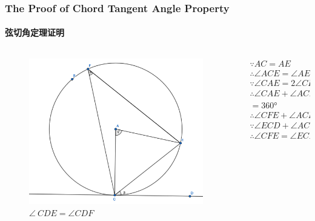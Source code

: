 \documentclass[
	11pt, %
]{beamer}
\begin{document}
\begin{frame}
\frametitle{The Proof of Chord Tangent Angle Property}
\framesubtitle{弦切角定理证明}

\begin{columns}[t] 
		\begin{column}{0.4\textwidth} %
			\begin{figure}
				\includegraphics[width=\linewidth]{Chord_Tangent_Angle_Proof.png}
				\caption{$\angle\ CDE=  \angle CDF$}
			\end{figure}
		\end{column}
		\begin{column}{0.6\textwidth} %
			\begin{equation*}
			\begin{aligned}
			&\because AC = AE\\
			&\therefore\angle ACE = \angle AEC\\
			&\because \angle CAE = 2 \angle CFE\\
			&\therefore \angle CAE + \angle ACE + \angle AEC
			&= 2(\angle CFE  + \angle ACE)\\
			&= \ang{360}\\
			&\therefore \angle CFE  + \angle ACE = \ang{90}\\
			&\because \angle ECD  + \angle ACE = \ang{90}\\
			&\therefore \angle CFE = \angle ECD \ Q.E.D.
			\end{aligned}
			\end{equation*}		
		\end{column}
	\end{columns}
\end{frame}
\end{document}

